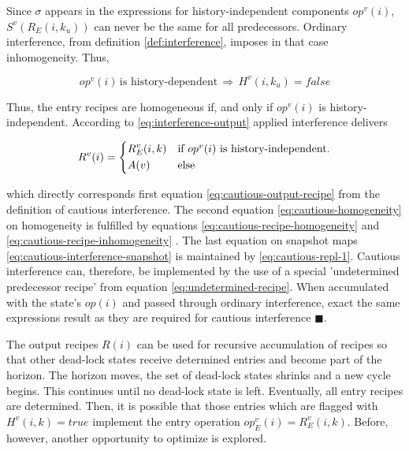 \documentclass[12pt,a4paper]{scrartcl}
\begin{document}
Since $\sigma$ appears in the expressions for history-independent components
$op^v(i)$, $S^v(R_E(i,k_u))$ can never be the same for all predecessors.
Ordinary interference, from definition \ref{def:interference}, imposes in that
case inhomogeneity. Thus,

\begin{equation} \label{eq:cautious-recipe-inhomogeneity}
    op^v(i) \,\mbox{is history-dependent}\,\Rightarrow\,H^v(i, k_u) = false
\end{equation}

Thus, the entry recipes are homogeneous if, and only if $op^v(i)$ is history-independent.
According to \eqref{eq:interference-output} applied interference delivers

\begin{equation} \label{eq:interference-output-2}
    R^v(i) = \begin{dcases*}
              R_E^v(i,k) & if $op^v(i)$ is history-independent.\\
              A(v)       & else
             \end{dcases*}
\end{equation}

which directly corresponds first equation \eqref{eq:cautious-output-recipe}
from the definition of cautious interference. The second equation
\eqref{eq:cautious-homogeneity} on homogeneity is fulfilled by equations
\eqref{eq:cautious-recipe-homogeneity} and
\eqref{eq:cautious-recipe-inhomogeneity} . The last equation on snapshot maps
\eqref{eq:cautious-interference-snapshot} is maintained by
\eqref{eq:cautious-repl-1}.  Cautious interference can, therefore, be
implemented by the use of a special 'undetermined predecessor recipe' from
equation \eqref{eq:undetermined-recipe}.  When accumulated with the state's
$op(i)$ and passed through ordinary interference, exact the same expressions
result as they are required for cautious interference $\blacksquare$.

The output recipes $R(i)$ can be used for recursive accumulation of recipes so
that other dead-lock states receive determined entries and become part of the
horizon.  The horizon moves, the set of dead-lock states shrinks and a new
cycle begins.  This continues until no dead-lock state is left.  Eventually,
all entry recipes are determined. Then, it is possible that those entries which
are flagged with $H^v(i,k)=true$ implement the entry operation
$op_E^v(i)=R_E^v(i,k)$.  Before, however, another opportunity to optimize is
explored. 
\end{document}
